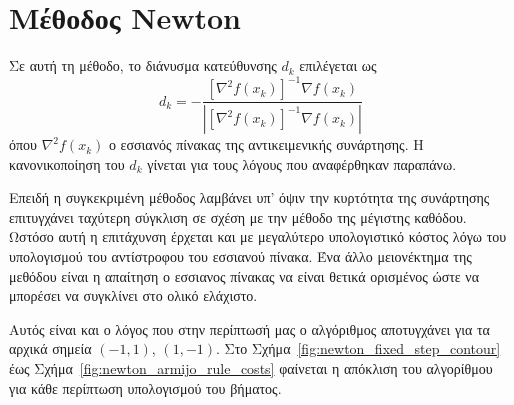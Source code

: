 \documentclass[a4paper,12pt]{article}
\begin{document}
\section*{Μέθοδος  Newton}
Σε αυτή τη μέθοδο, το διάνυσμα κατεύθυνσης $d_k$ επιλέγεται ως 
\[d_k = -\frac{[\nabla^2 f(x_k)]^{-1} \nabla f(x_k)}{|[\nabla^2 f(x_k)]^{-1} \nabla f(x_k)|}\]
όπου $\nabla^2 f(x_k)$ ο εσσιανός πίνακας της αντικειμενικής συνάρτησης. Η κανονικοποίηση του $d_k$ 
γίνεται για τους λόγους που αναφέρθηκαν παραπάνω. 

Επειδή η συγκεκριμένη μέθοδος λαμβάνει υπ' όψιν
την κυρτότητα της συνάρτησης επιτυγχάνει ταχύτερη σύγκλιση σε σχέση με την μέθοδο της μέγιστης καθόδου.
Ωστόσο αυτή η επιτάχυνση έρχεται και με μεγαλύτερο υπολογιστικό κόστος λόγω του υπολογισμού του αντίστροφου
του εσσιανού πίνακα. Ένα άλλο μειονέκτημα της μεθόδου είναι η απαίτηση ο εσσιανος πίνακας να είναι θετικά 
ορισμένος ώστε να μπορέσει να συγκλίνει στο ολικό ελάχιστο. 

Αυτός είναι και ο λόγος που στην περίπτωσή μας
ο αλγόριθμος αποτυγχάνει για τα αρχικά σημεία $(-1, 1)$, $(1, -1)$. Στο Σχήμα~\ref{fig:newton_fixed_step_contour}
έως Σχήμα~\ref{fig:newton_armijo_rule_costs} φαίνεται η απόκλιση του αλγορίθμου για κάθε περίπτωση υπολογισμού
του βήματος.
\end{document}
